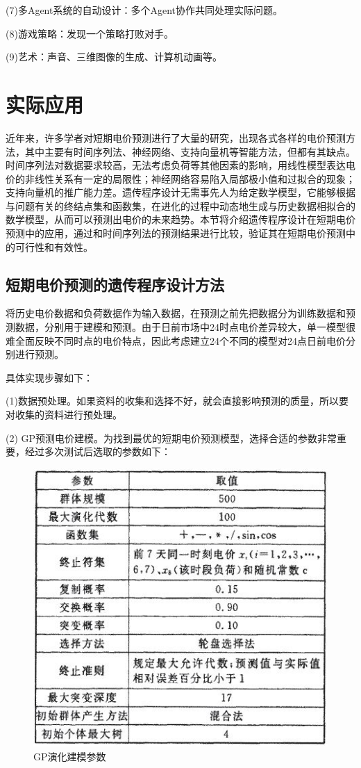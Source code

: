 \documentclass[UTF8]{ctexart}
\begin{document}
(7)多Agent系统的自动设计：多个Agent协作共同处理实际问题。

(8)游戏策略：发现一个策略打败对手。

(9)艺术：声音、三维图像的生成、计算机动画等。

\newpage
\section{实际应用}
近年来，许多学者对短期电价预测进行了大量的研究，出现各式各样的电价预测方法，其中主要有时间序列法、神经网络、支持向量机等智能方法，但都有其缺点。时间序列法对数据要求较高，无法考虑负荷等其他因素的影响，用线性模型表达电价的非线性关系有一定的局限性；神经网络容易陷入局部极小值和过拟合的现象；支持向量机的推广能力差。遗传程序设计无需事先人为给定数学模型，它能够根据与问题有关的终结点集和函数集，在进化的过程中动态地生成与历史数据相拟合的数学模型，从而可以预测出电价的未来趋势。本节将介绍遗传程序设计在短期电价预测中的应用，通过和时间序列法的预测结果进行比较，验证其在短期电价预测中的可行性和有效性。

\subsection{短期电价预测的遗传程序设计方法}
将历史电价数据和负荷数据作为输入数据，在预测之前先把数据分为训练数据和预测数据，分别用于建模和预测。由于日前市场中24时点电价差异较大，单一模型很难全面反映不同时点的电价特点，因此考虑建立24个不同的模型对24点日前电价分别进行预测。

具体实现步骤如下：

(1)数据预处理。如果资料的收集和选择不好，就会直接影响预测的质量，所以要对收集的资料进行预处理。

(2) GP预测电价建模。为找到最优的短期电价预测模型，选择合适的参数非常重要，经过多次测试后选取的参数如下：
	\begin{figure}[ht]
		\centering	
		\includegraphics[scale=0.6]{images/example_parameter.png}
		\caption{GP演化建模参数}
		\label{fig:label}
	\end{figure}
\end{document}
